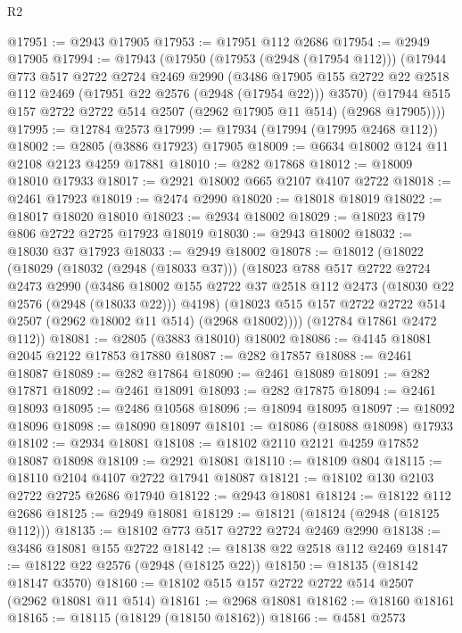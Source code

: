 \begin{lexlean}{R2}
\begin{coremodule}
@17951 := @2943 @17905
@17953 := @17951 @112 @2686
@17954 := @2949 @17905
@17994 := @17943
    (@17950
      (@17953 (@2948 (@17954 @112)))
      (@17944
        @773
        @517
        @2722
        @2724
        @2469
        @2990
        (@3486 @17905 @155 @2722 @22 @2518 @112 @2469 (@17951 @22 @2576 (@2948 (@17954 @22))) @3570)
        (@17944 @515 @157 @2722 @2722 @514 @2507 (@2962 @17905 @11 @514) (@2968 @17905))))
@17995 := @12784 @2573
@17999 := @17934 (@17994 (@17995 @2468 @112))
@18002 := @2805 (@3886 @17923) @17905
@18009 := @6634 @18002 @124 @11 @2108 @2123 @4259 @17881
@18010 := @282 @17868
@18012 := @18009 @18010 @17933
@18017 := @2921 @18002 @665 @2107 @4107 @2722
@18018 := @2461 @17923
@18019 := @2474 @2990
@18020 := @18018 @18019
@18022 := @18017 @18020 @18010
@18023 := @2934 @18002
@18029 := @18023 @179 @806 @2722 @2725 @17923 @18019
@18030 := @2943 @18002
@18032 := @18030 @37 @17923
@18033 := @2949 @18002
@18078 := @18012
    (@18022
      (@18029
        (@18032 (@2948 (@18033 @37)))
        (@18023
          @788
          @517
          @2722
          @2724
          @2473
          @2990
          (@3486
            @18002
            @155
            @2722
            @37
            @2518
            @112
            @2473
            (@18030 @22 @2576 (@2948 (@18033 @22)))
            @4198)
          (@18023 @515 @157 @2722 @2722 @514 @2507 (@2962 @18002 @11 @514) (@2968 @18002))))
      (@12784 @17861 @2472 @112))
@18081 := @2805 (@3883 @18010) @18002
@18086 := @4145 @18081 @2045 @2122 @17853 @17880
@18087 := @282 @17857
@18088 := @2461 @18087
@18089 := @282 @17864
@18090 := @2461 @18089
@18091 := @282 @17871
@18092 := @2461 @18091
@18093 := @282 @17875
@18094 := @2461 @18093
@18095 := @2486 @10568
@18096 := @18094 @18095
@18097 := @18092 @18096
@18098 := @18090 @18097
@18101 := @18086 (@18088 @18098) @17933
@18102 := @2934 @18081
@18108 := @18102 @2110 @2121 @4259 @17852 @18087 @18098
@18109 := @2921 @18081
@18110 := @18109 @804
@18115 := @18110 @2104 @4107 @2722 @17941 @18087
@18121 := @18102 @130 @2103 @2722 @2725 @2686 @17940
@18122 := @2943 @18081
@18124 := @18122 @112 @2686
@18125 := @2949 @18081
@18129 := @18121 (@18124 (@2948 (@18125 @112)))
@18135 := @18102 @773 @517 @2722 @2724 @2469 @2990
@18138 := @3486 @18081 @155 @2722
@18142 := @18138 @22 @2518 @112 @2469
@18147 := @18122 @22 @2576 (@2948 (@18125 @22))
@18150 := @18135 (@18142 @18147 @3570)
@18160 := @18102 @515 @157 @2722 @2722 @514 @2507 (@2962 @18081 @11 @514)
@18161 := @2968 @18081
@18162 := @18160 @18161
@18165 := @18115 (@18129 (@18150 @18162))
@18166 := @4581 @2573

\end{coremodule}
\end{lexlean}
